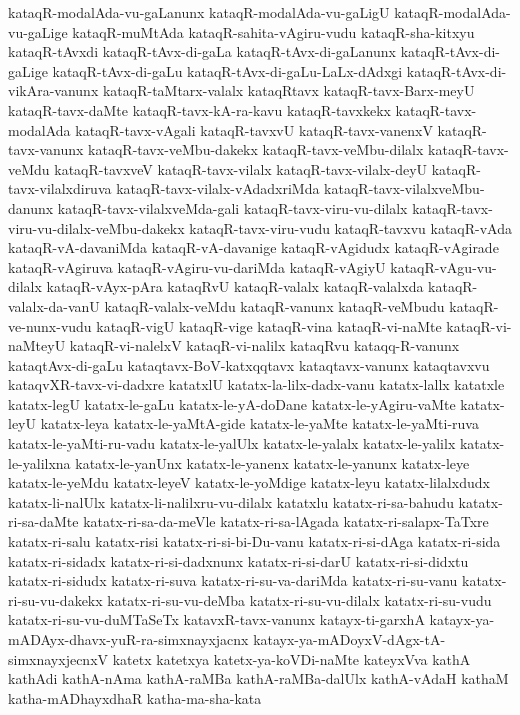 {kataqR-modalAda-vu-gaLanunx
kataqR-modalAda-vu-gaLigU
kataqR-modalAda-vu-gaLige
kataqR-muMtAda
kataqR-sahita-vAgiru-vudu
kataqR-sha-kitxyu
kataqR-tAvxdi
kataqR-tAvx-di-gaLa
kataqR-tAvx-di-gaLanunx
kataqR-tAvx-di-gaLige
kataqR-tAvx-di-gaLu
kataqR-tAvx-di-gaLu-LaLx-dAdxgi
kataqR-tAvx-di-vikAra-vanunx
kataqR-taMtarx-valalx
kataqRtavx
kataqR-tavx-Barx-meyU
kataqR-tavx-daMte
kataqR-tavx-kA-ra-kavu
kataqR-tavxkekx
kataqR-tavx-modalAda
kataqR-tavx-vAgali
kataqR-tavxvU
kataqR-tavx-vanenxV
kataqR-tavx-vanunx
kataqR-tavx-veMbu-dakekx
kataqR-tavx-veMbu-dilalx
kataqR-tavx-veMdu
kataqR-tavxveV
kataqR-tavx-vilalx
kataqR-tavx-vilalx-deyU
kataqR-tavx-vilalxdiruva
kataqR-tavx-vilalx-vAdadxriMda
kataqR-tavx-vilalxveMbu-danunx
kataqR-tavx-vilalxveMda-gali
kataqR-tavx-viru-vu-dilalx
kataqR-tavx-viru-vu-dilalx-veMbu-dakekx
kataqR-tavx-viru-vudu
kataqR-tavxvu
kataqR-vAda
kataqR-vA-davaniMda
kataqR-vA-davanige
kataqR-vAgidudx
kataqR-vAgirade
kataqR-vAgiruva
kataqR-vAgiru-vu-dariMda
kataqR-vAgiyU
kataqR-vAgu-vu-dilalx
kataqR-vAyx-pAra
kataqRvU
kataqR-valalx
kataqR-valalxda
kataqR-valalx-da-vanU
kataqR-valalx-veMdu
kataqR-vanunx
kataqR-veMbudu
kataqR-ve-nunx-vudu
kataqR-vigU
kataqR-vige
kataqR-vina
kataqR-vi-naMte
kataqR-vi-naMteyU
kataqR-vi-nalelxV
kataqR-vi-nalilx
kataqRvu
kataqq-R-vanunx
kataqtAvx-di-gaLu
kataqtavx-BoV-katxqqtavx
kataqtavx-vanunx
kataqtavxvu
kataqvXR-tavx-vi-dadxre
katatxlU
katatx-la-lilx-dadx-vanu
katatx-lallx
katatxle
katatx-legU
katatx-le-gaLu
katatx-le-yA-doDane
katatx-le-yAgiru-vaMte
katatx-leyU
katatx-leya
katatx-le-yaMtA-gide
katatx-le-yaMte
katatx-le-yaMti-ruva
katatx-le-yaMti-ru-vadu
katatx-le-yalUlx
katatx-le-yalalx
katatx-le-yalilx
katatx-le-yalilxna
katatx-le-yanUnx
katatx-le-yanenx
katatx-le-yanunx
katatx-leye
katatx-le-yeMdu
katatx-leyeV
katatx-le-yoMdige
katatx-leyu
katatx-lilalxdudx
katatx-li-nalUlx
katatx-li-nalilxru-vu-dilalx
katatxlu
katatx-ri-sa-bahudu
katatx-ri-sa-daMte
katatx-ri-sa-da-meVle
katatx-ri-sa-lAgada
katatx-ri-salapx-TaTxre
katatx-ri-salu
katatx-risi
katatx-ri-si-bi-Du-vanu
katatx-ri-si-dAga
katatx-ri-sida
katatx-ri-sidadx
katatx-ri-si-dadxnunx
katatx-ri-si-darU
katatx-ri-si-didxtu
katatx-ri-sidudx
katatx-ri-suva
katatx-ri-su-va-dariMda
katatx-ri-su-vanu
katatx-ri-su-vu-dakekx
katatx-ri-su-vu-deMba
katatx-ri-su-vu-dilalx
katatx-ri-su-vudu
katatx-ri-su-vu-duMTaSeTx
katavxR-tavx-vanunx
katayx-ti-garxhA
katayx-ya-mADAyx-dhavx-yuR-ra-simxnayxjacnx
katayx-ya-mADoyxV-dAgx-tA-simxnayxjecnxV
katetx
katetxya
katetx-ya-koVDi-naMte
kateyxVva
kathA
kathAdi
kathA-nAma
kathA-raMBa
kathA-raMBa-dalUlx
kathA-vAdaH
kathaM
katha-mADhayxdhaR
katha-ma-sha-kata
}
